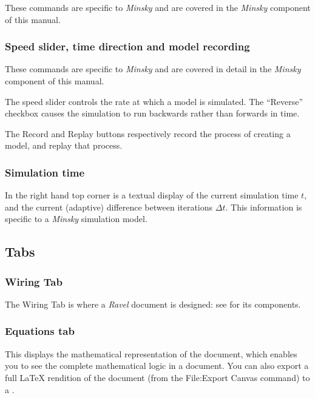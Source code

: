 These commands are specific to \emph{Minsky} and are covered in the
\emph{Minsky} component of this manual.

\subsubsection{Speed slider, time direction and model recording}

These commands are specific to \emph{Minsky} and are covered in detail
in the \emph{Minsky} component of this manual.

The speed slider controls the rate at which a model is simulated.
The ``Reverse'' checkbox causes the simulation to run backwards
rather than forwards in time. 

The Record and Replay buttons respectively record the process of creating
a model, and replay that process. 

\subsubsection{Simulation time}

In the right hand top corner is a textual display of the current simulation
time $t$, and the current (adaptive) difference between iterations
$\Delta t$. This information is specific to a \emph{Minsky} simulation
model.

\subsection{Tabs}

\subsubsection{Wiring Tab}

The Wiring Tab is where a \emph{Ravel} document is designed: see
for its components.

\subsubsection{Equations tab}

\label{tabs:Equations}

This displays the mathematical representation of the document, which
enables you to see the complete mathematical logic in a document.
You can also export a full \LaTeX{} rendition of the document (from the
File:Export Canvas command) to a .

